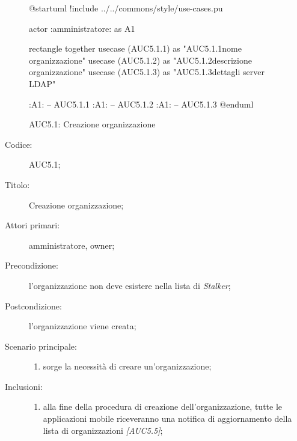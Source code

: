 \documentclass[../../../analisi-dei-requisiti.tex]{subfiles}
\begin{document}
\begin{figure}[H]
  \centering
  \begin{plantuml}
    @startuml
    !include ../../commons/style/use-cases.pu

    actor :amministratore: as A1

    rectangle {
        together {
            usecase (AUC5.1.1) as "AUC5.1.1\nInserisci nome organizzazione"
            usecase (AUC5.1.2) as "AUC5.1.2\nInserisci descrizione organizzazione"
            usecase (AUC5.1.3) as "AUC5.1.3\nConfigurazione dettagli server LDAP"
          }
      }

    :A1: -- AUC5.1.1
    :A1: -- AUC5.1.2
    :A1: -- AUC5.1.3
    @enduml
  \end{plantuml}
  \caption{AUC5.1: Creazione organizzazione}%
  \label{fig:AUC5_1}
\end{figure}

\begin{description}
  \item[Codice:] AUC5.1;
  \item[Titolo:] Creazione organizzazione;
  \item[Attori primari:] amministratore, owner;
  \item[Precondizione:] l'organizzazione non deve esistere nella lista di \emph{Stalker};
  \item[Postcondizione:] l'organizzazione viene creata;
  \item[Scenario principale:]
        \begin{enumerate}
          \item sorge la necessità di creare un'organizzazione;
        \end{enumerate}
  \item[Inclusioni:]
        \begin{enumerate}
          \item alla fine della procedura di creazione dell'organizzazione, tutte le applicazioni mobile riceveranno una notifica di aggiornamento
                della lista di organizzazioni \emph{[AUC5.5]};
        \end{enumerate}
\end{description}
\end{document}
